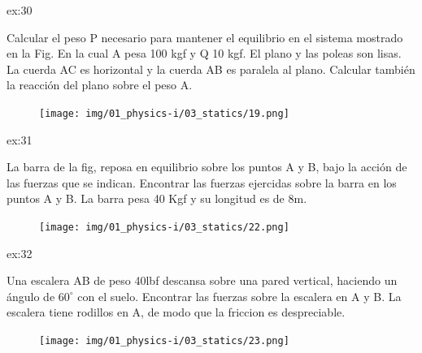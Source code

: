 \begin{multicols}{2}
    \begin{excercise}[][][$P=587\ \mathrm{Kgf} $, $R=81.5\ \mathrm{Kgf}$]{ex:30}{
        Calcular el peso P necesario para mantener el equilibrio en el sistema mostrado en la Fig. En la cual A pesa 100 kgf y Q 10 kgf. El plano y las poleas son lisas. La cuerda AC es horizontal y la cuerda AB es paralela al plano. Calcular también la reacción del plano sobre el peso A.     
         \begin{figure}[H]
             \centering
             \texttt{[image: img/01\_physics-i/03\_statics/19.png]}
         \end{figure}
         } 
     \end{excercise}    %
    \begin{excercise}[][][$F_A=630.9\ \mathrm{Kgf} $, $R=509.1\ \mathrm{Kgf}$]{ex:31}{
        La barra de la fig, reposa en equilibrio sobre los puntos A y B, bajo la acción de las fuerzas que se indican. Encontrar las fuerzas ejercidas sobre la barra en los puntos A y B. La barra pesa 40 Kgf y su longitud es de 8m.
         \begin{figure}[H]
             \centering
             \texttt{[image: img/01\_physics-i/03\_statics/22.png]}
         \end{figure}
         } 
     \end{excercise}    %
    \begin{excercise}[][][$F_1=F_3=11.5\ \mathrm{lbf} $, $F_2=40\ \mathrm{lgf}$]{ex:32}{
        Una escalera AB de peso 40lbf descansa sobre una pared vertical, haciendo un ángulo de $60^\circ$ con el suelo. Encontrar las fuerzas sobre la escalera en A y B. La escalera tiene rodillos en A, de modo que la friccion es despreciable.   
        \begin{figure}[H]
             \centering
             \texttt{[image: img/01\_physics-i/03\_statics/23.png]}
         \end{figure}     
        } 
     \end{excercise}

\end{multicols}
